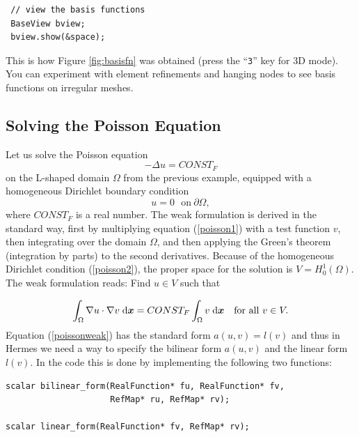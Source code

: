 \documentclass[11pt]{article}
\newcommand{\bfx}{\mbox{\boldmath $x$}}
\begin{document}
\begin{lstlisting}
 // view the basis functions
 BaseView bview;
 bview.show(&space);
\end{lstlisting}

This is how Figure \ref{fig:basisfn} was obtained (press the ``{\tt 3}'' key for 3D mode).
You can experiment with element refinements and hanging nodes to see basis functions
on irregular meshes.




\subsection{Solving the Poisson Equation}
\label{sec:poisson}

Let us solve the Poisson equation
\begin{equation} \label{poisson1}
-\Delta u = CONST_F
\end{equation}
on the L-shaped domain $\Omega$ from the previous example,
equipped with a homogeneous Dirichlet boundary condition
\begin{equation} \label{poisson2}
u = 0\ \ \  \mbox{on}\  \partial \Omega,
\end{equation}
where $CONST_F$ is a real number. The weak formulation 
is derived in the standard way, first by multiplying equation (\ref{poisson1}) with a test
function $v$, then integrating over the domain $\Omega$, and then applying the Green's
theorem (integration by parts) to the second derivatives.
Because of the homogeneous Dirichlet condition
(\ref{poisson2}),
the proper space for the solution is $V = H^1_0(\Omega)$. The weak formulation reads:
Find $u \in V$ such that

\begin{equation} \label{poissonweak}
  \int_\Omega \nabla u \cdot \nabla v \;\mbox{d\bfx} = CONST_F \int_\Omega v \;\mbox{d\bfx}
\ \ \ \mbox{for all}\ v \in V.
\end{equation}
Equation (\ref{poissonweak}) has the standard form $a(u,v) = l(v)$ and thus in Hermes
we need a way to specify the bilinear form $a(u,v)$ and the linear form $l(v)$.
 
In the code this is done by implementing the following two functions:

\begin{lstlisting}
scalar bilinear_form(RealFunction* fu, RealFunction* fv,
                     RefMap* ru, RefMap* rv);

scalar linear_form(RealFunction* fv, RefMap* rv);
\end{lstlisting}
\end{document}

